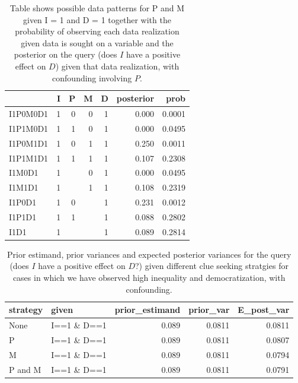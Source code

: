 \documentclass[
  12pt,
]{book}
\begin{document}
\begin{table}

\caption{\label{tab:possoutpimdconf}\label{possible_outcomespimd_conf} Table shows possible data patterns for P and M given I = 1 and D = 1 together with the probability of observing each data realization given data is sought on a variable and the posterior on the query (does $I$ have a positive effect on $D$) given that data realization, with confounding involving $P$.}
\centering
\begin{tabular}[t]{l|r|r|r|r|r|r}
\hline
  & I & P & M & D & posterior & prob\\
\hline
I1P0M0D1 & 1 & 0 & 0 & 1 & 0.000 & 0.0001\\
\hline
I1P1M0D1 & 1 & 1 & 0 & 1 & 0.000 & 0.0495\\
\hline
I1P0M1D1 & 1 & 0 & 1 & 1 & 0.250 & 0.0011\\
\hline
I1P1M1D1 & 1 & 1 & 1 & 1 & 0.107 & 0.2308\\
\hline
I1M0D1 & 1 &  & 0 & 1 & 0.000 & 0.0495\\
\hline
I1M1D1 & 1 &  & 1 & 1 & 0.108 & 0.2319\\
\hline
I1P0D1 & 1 & 0 &  & 1 & 0.231 & 0.0012\\
\hline
I1P1D1 & 1 & 1 &  & 1 & 0.088 & 0.2802\\
\hline
I1D1 & 1 &  &  & 1 & 0.089 & 0.2814\\
\hline
\end{tabular}
\end{table}

\begin{table}

\caption{\label{tab:pimdlearni1d1con}\label{pimdlearn_i1d1con}Prior estimand, prior variances and expected posterior variances for the query (does $I$ have a positive effect on $D$?) given different  clue seeking  stratgies for cases in which we have observed high inequality and democratization, with confounding.}
\centering
\begin{tabular}[t]{l|l|r|r|r}
\hline
strategy & given & prior\_estimand & prior\_var & E\_post\_var\\
\hline
None & I==1 \& D==1 & 0.089 & 0.0811 & 0.0811\\
\hline
P & I==1 \& D==1 & 0.089 & 0.0811 & 0.0807\\
\hline
M & I==1 \& D==1 & 0.089 & 0.0811 & 0.0794\\
\hline
P and M & I==1 \& D==1 & 0.089 & 0.0811 & 0.0791\\
\hline
\end{tabular}
\end{table}
\end{document}
